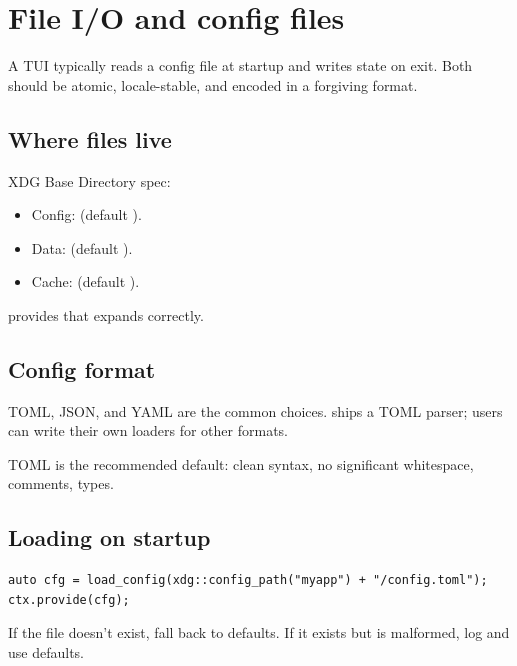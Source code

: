 \chapter{File I/O and config files}
\label{ch:fileio}

\begin{aside}
A TUI typically reads a config file at startup and writes
state on exit. Both should be atomic, locale-stable, and
encoded in a forgiving format.
\end{aside}

\section{Where files live}

XDG Base Directory spec:

\begin{itemize}[leftmargin=*]
  \item Config: 
    (default ).
  \item Data:  (default
    ).
  \item Cache:  (default
    ).
\end{itemize}

\maya{} provides  that
expands correctly.

\section{Config format}

TOML, JSON, and YAML are the common choices. \maya{} ships
a TOML parser; users can write their own loaders for other
formats.

TOML is the recommended default: clean syntax, no
significant whitespace, comments, types.

\section{Loading on startup}

\begin{lstlisting}
auto cfg = load_config(xdg::config_path("myapp") + "/config.toml");
ctx.provide(cfg);
\end{lstlisting}

If the file doesn't exist, fall back to defaults. If it
exists but is malformed, log and use defaults.

